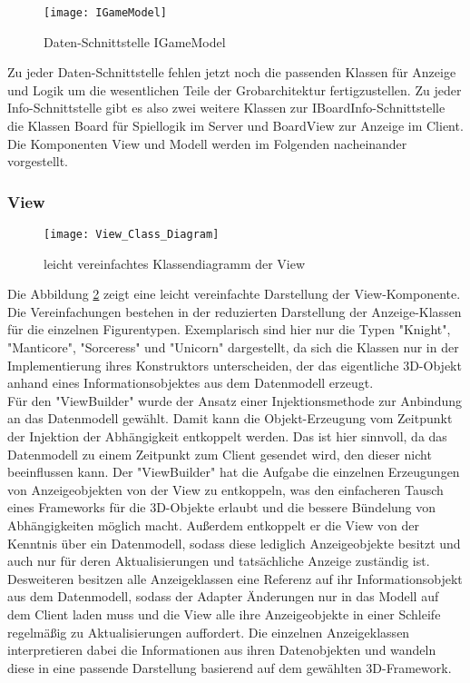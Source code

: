 \begin{figure}[htp]
	\centering
	\captionsetup{justification=centering}
	\texttt{[image: IGameModel]}
	\caption[IGameModel]{Daten-Schnittstelle IGameModel}
	\label{fig:IGameModel}
\end{figure}
\noindent Zu jeder Daten-Schnittstelle fehlen jetzt noch die passenden Klassen für Anzeige und Logik um die wesentlichen Teile der Grobarchitektur fertigzustellen. Zu jeder Info-Schnittstelle gibt es also zwei weitere Klassen \zB zur IBoardInfo-Schnittstelle die Klassen Board für Spiellogik im Server und BoardView zur Anzeige im Client. Die Komponenten View und Modell werden im Folgenden nacheinander vorgestellt.
\clearpage
\subsubsection{View}
\begin{figure}[htp]
	\centering
	\captionsetup{justification=centering}
	\texttt{[image: View\_Class\_Diagram]}
	\caption[View]{leicht vereinfachtes Klassendiagramm der View}
	\label{fig:ClassesView}
\end{figure}

\noindent Die Abbildung \ref{fig:ClassesView} zeigt eine leicht vereinfachte Darstellung der View-Komponente. Die Vereinfachungen bestehen in der reduzierten Darstellung der Anzeige-Klassen für die einzelnen Figurentypen. Exemplarisch sind hier nur die Typen "Knight", "Manticore", "Sorceress" und "Unicorn" dargestellt, da sich die Klassen nur in der Implementierung ihres Konstruktors unterscheiden, der das eigentliche 3D-Objekt anhand eines Informationsobjektes aus dem Datenmodell erzeugt.\\
Für den "ViewBuilder" wurde der Ansatz einer Injektionsmethode zur Anbindung an das Datenmodell gewählt. Damit kann die Objekt-Erzeugung vom Zeitpunkt der Injektion der Abhängigkeit entkoppelt werden. Das ist hier sinnvoll, da das Datenmodell zu einem Zeitpunkt zum Client gesendet wird, den dieser nicht beeinflussen kann. Der "ViewBuilder" hat die Aufgabe die einzelnen Erzeugungen von Anzeigeobjekten von der View zu entkoppeln, was den einfacheren Tausch eines Frameworks für die 3D-Objekte erlaubt und die bessere Bündelung von Abhängigkeiten möglich macht. Außerdem entkoppelt er die View von der Kenntnis über ein Datenmodell, sodass diese lediglich Anzeigeobjekte besitzt und auch nur für deren Aktualisierungen und tatsächliche Anzeige zuständig ist.\\
Desweiteren besitzen alle Anzeigeklassen eine Referenz auf ihr Informationsobjekt aus dem Datenmodell, sodass der Adapter Änderungen nur in das Modell auf dem Client laden muss und die View alle ihre Anzeigeobjekte in einer Schleife regelmäßig zu Aktualisierungen auffordert. Die einzelnen Anzeigeklassen interpretieren dabei die Informationen aus ihren Datenobjekten und wandeln diese in eine passende Darstellung basierend auf dem gewählten 3D-Framework.\\

